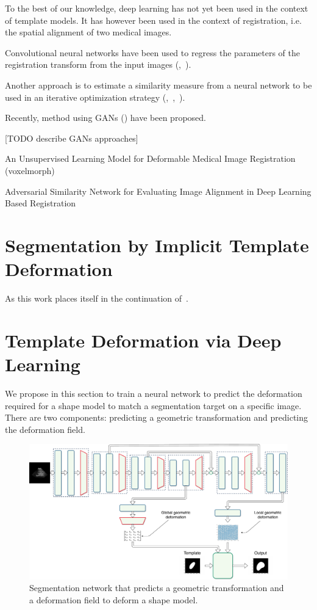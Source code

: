 To the best of our knowledge, deep learning has not yet been used in the context of template models. It has however been used in the context of registration, i.e. the spatial alignment of two medical images.

Convolutional neural networks have been used to regress the parameters of the registration transform from the input images (\textcite{miao2016},~\textcite{yang2016}).

Another approach is to estimate a similarity measure from a neural network to be used in an iterative optimization strategy (\textcite{wu2013MICCAI},~\textcite{cheng2015},~\textcite{simonovosky2016MICCAI}).

Recently, method using GANs (\textcite{goodfellow2014}) have been proposed.  

[TODO describe GANs approaches]

An Unsupervised Learning Model for Deformable Medical Image Registration (voxelmorph)

Adversarial Similarity Network for Evaluating Image Alignment in Deep Learning Based Registration

\section{Segmentation by Implicit Template Deformation}

As this work places itself in the continuation of~\textcite{mory2012MICCAI}.

\section{Template Deformation via Deep Learning}
\label{sec:deformable_dl}

We propose in this section to train a neural network to predict the deformation required for a shape model to match a segmentation target on a specific image. There are two components: predicting a geometric transformation and predicting the deformation field.

\begin{figure}[htbp]
	\includegraphics[width=\textwidth]{img_seg/deformation_network}
    \caption{Segmentation network that predicts a geometric transformation and a deformation field to deform a shape model.}
    \label{fig:deform_network}
\end{figure}


